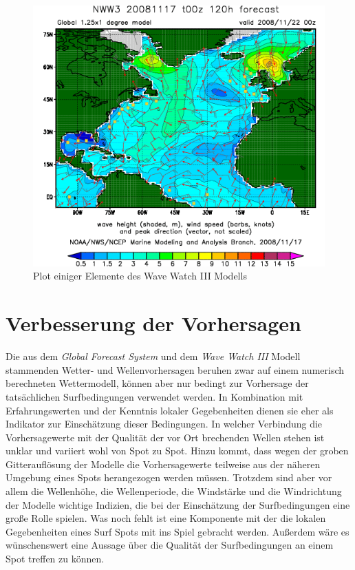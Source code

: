 \begin{figure}[h]
  \begin{center}
    \includegraphics[width=\textwidth]{bilder/wave-watch}
    \caption{Plot einiger Elemente des Wave Watch III Modells}
    \label{wave-watch-grads}
  \end{center}
\end{figure}

\section{Verbesserung der Vorhersagen}
Die aus dem \textit{Global Forecast System} und dem \textit{Wave Watch
  III} Modell stammenden Wetter- und Wellenvorhersagen beruhen zwar
auf einem numerisch berechneten Wettermodell, können aber nur bedingt
zur Vorhersage der tatsächlichen Surfbedingungen verwendet werden. In
Kombination mit Erfahrungswerten und der Kenntnis lokaler
Gegebenheiten dienen sie eher als Indikator zur Einschätzung dieser
Bedingungen. In welcher Verbindung die Vorhersagewerte mit der
Qualität der vor Ort brechenden Wellen stehen ist unklar und variiert
wohl von Spot zu Spot. Hinzu kommt, dass wegen der groben
Gitterauflösung der Modelle die Vorhersagewerte teilweise aus der
näheren Umgebung eines Spots herangezogen werden müssen. Trotzdem sind
aber vor allem die Wellenhöhe, die Wellenperiode, die Windstärke und
die Windrichtung der Modelle wichtige Indizien, die bei der
Einschätzung der Surfbedingungen eine große Rolle spielen. Was noch
fehlt ist eine Komponente mit der die lokalen Gegebenheiten eines Surf
Spots mit ins Spiel gebracht werden. Außerdem wäre es wünschenswert
eine Aussage über die Qualität der Surfbedingungen an einem Spot
treffen zu können.

